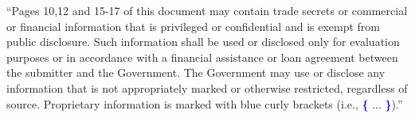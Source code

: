 \documentclass[times,11pt,portrait]{article} %
\date{}
\begin{document}
\maketitle


``Pages 10,12 and 15-17 of this document may contain trade secrets or commercial 
or financial information that is privileged or confidential and is exempt from 
public disclosure. Such information shall be used or disclosed only for 
evaluation purposes or in accordance with a financial assistance or loan 
agreement between the submitter and the Government. The Government may use or 
disclose any information that is not appropriately marked or otherwise 
restricted, regardless of source. Proprietary information is marked with blue 
curly brackets (i.e., \textcolor{blue}{\textbf{\{}} ... 
\textcolor{blue}{\textbf{\}}}).''



\end{document}
